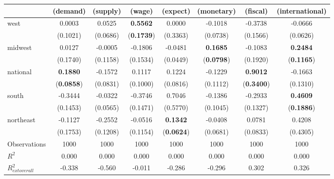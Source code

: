 \begin{tabular}{lccccccc}
\toprule
 & (demand) & (supply) & (wage) & (expect) & (monetary) & (fiscal) & (international) \\
\midrule
west & 0.0003 & 0.0525 & \textbf{0.5562} & 0.0000 & -0.1018 & -0.3738 & -0.0666 \\
\vspace{0.2cm}
 & (0.1021) & (0.0686) & (\textbf{0.1739}) & (0.3363) & (0.0738) & (0.1566) & (0.0626) \\
midwest & 0.0127 & -0.0005 & -0.1806 & -0.0481 & \textbf{0.1685} & -0.1083 & \textbf{0.2484} \\
\vspace{0.2cm}
 & (0.1740) & (0.1158) & (0.1534) & (0.0449) & (\textbf{0.0798}) & (0.1920) & (\textbf{0.1165}) \\
national & \textbf{0.1880} & -0.1572 & 0.1117 & 0.1224 & -0.1229 & \textbf{0.9012} & -0.1663 \\
\vspace{0.2cm}
 & (\textbf{0.0858}) & (0.0831) & (0.1000) & (0.0816) & (0.1112) & (\textbf{0.3400}) & (0.1310) \\
south & -0.3444 & -0.0322 & -0.3746 & 0.7046 & -0.1386 & -0.2933 & \textbf{0.4609} \\
\vspace{0.2cm}
 & (0.1453) & (0.0565) & (0.1471) & (0.5770) & (0.1045) & (0.1327) & (\textbf{0.1886}) \\
northeast & -0.1127 & -0.2552 & -0.0516 & \textbf{0.1342} & -0.0408 & 0.0781 & 0.4208 \\
\vspace{0.2cm}
 & (0.1753) & (0.1208) & (0.1154) & (\textbf{0.0624}) & (0.0681) & (0.0833) & (0.4305) \\
\midrule
Observations & 1000 & 1000 & 1000 & 1000 & 1000 & 1000 & 1000 \\
$R^2$ & 0.000 & 0.000 & 0.000 & 0.000 & 0.000 & 0.000 & 0.000 \\
$R^2_{	ext{overall}}$ & -0.338 & -0.560 & -0.011 & -0.286 & -0.296 & 0.302 & 0.326 \\
\bottomrule
\end{tabular}